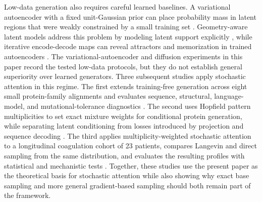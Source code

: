 Low-data generation also requires careful learned baselines. A variational
autoencoder with a fixed unit-Gaussian prior can place probability mass in
latent regions that were weakly constrained by a small training set
\cite{kingmaWellingAutoEncoding2014}. Geometry-aware latent models address this
problem by modeling latent support explicitly
\cite{chadebecGeometryVAE2023}, while iterative encode-decode maps can reveal
attractors and memorization in trained autoencoders
\cite{fumeroLatentDynamics2026}. The variational-autoencoder and diffusion
experiments in this paper record the tested low-data protocols, but they do not
establish general superiority over learned generators. Three subsequent studies
apply stochastic attention in this regime. The first extends training-free
generation across eight small protein-family alignments and evaluates sequence,
structural, language-model, and mutational-tolerance diagnostics
\cite{varnerTrainingFreeProtein2026}. The second uses Hopfield pattern
multiplicities to set exact mixture weights for conditional protein generation,
while separating latent conditioning from losses introduced by projection and
sequence decoding \cite{varnerConditioningProtein2026}. The third applies
multiplicity-weighted stochastic attention to a longitudinal coagulation cohort
of 23 patients, compares Langevin and direct sampling from the same
distribution, and evaluates the resulting profiles with statistical and
mechanistic tests \cite{varnerSyntheticPatient2026}. Together, these studies
use the present paper as the theoretical basis for stochastic attention while
also showing why exact base sampling and more general gradient-based sampling
should both remain part of the framework.
